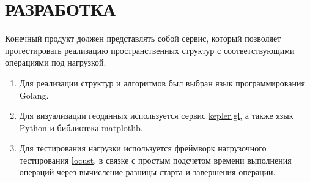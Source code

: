 \chapter{РАЗРАБОТКА}
\label{cha:development}

Конечный продукт должен представлять собой сервис, который позволяет протестировать реализацию пространственных структур с соответствующими операциями под нагрузкой.
\begin{enumerate}
    \item Для реализации структур и алгоритмов был выбран язык программирования Golang.
    \item Для визуализации геоданных используется сервис \href{https://kepler.gl/}{kepler.gl}, а также язык Python и библиотека matplotlib.
    \item Для тестирования нагрузки используется фреймворк нагрузочного тестирования \href{https://locust.io/}{locust}, в связке с простым подсчетом времени выполнения операций через вычисление разницы старта и завершения операции.
\end{enumerate}
